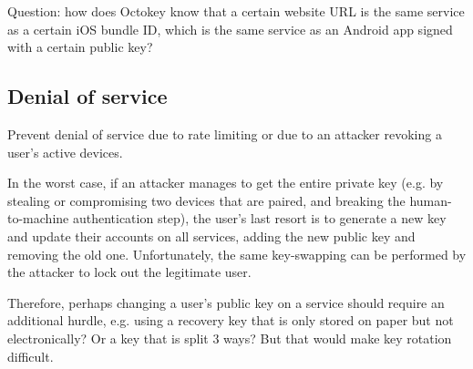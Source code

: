 Question: how does Octokey know that a certain website URL is the same service as a certain iOS
bundle ID, which is the same service as an Android app signed with a certain public key?

\subsection{Denial of service}

Prevent denial of service due to rate limiting or due to an attacker revoking a user's active
devices.

In the worst case, if an attacker manages to get the entire private key (e.g. by stealing or
compromising two devices that are paired, and breaking the human-to-machine authentication step),
the user's last resort is to generate a new key and update their accounts on all services, adding
the new public key and removing the old one. Unfortunately, the same key-swapping can be performed
by the attacker to lock out the legitimate user.

Therefore, perhaps changing a user's public key on a service should require an additional hurdle,
e.g. using a recovery key that is only stored on paper but not electronically? Or a key that is
split 3 ways? But that would make key rotation difficult.
